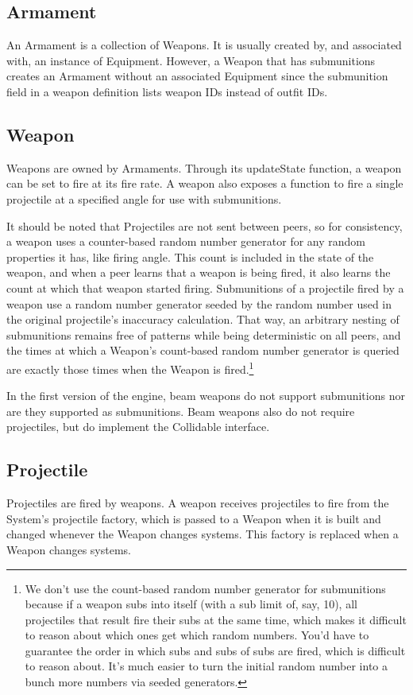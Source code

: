 \documentclass{article}
\begin{document}
\subsection{Armament}
An Armament is a collection of Weapons. It is usually created by, and associated with, an instance of Equipment. However, a Weapon that has submunitions creates an Armament without an associated Equipment since the submunition field in a weapon definition lists weapon IDs instead of outfit IDs.

\subsection{Weapon}
Weapons are owned by Armaments. Through its updateState function, a weapon can be set to fire at its fire rate. A weapon also exposes a function to fire a single projectile at a specified angle for use with submunitions.

It should be noted that Projectiles are not sent between peers, so for consistency, a weapon uses a counter-based random number generator for any random properties it has, like firing angle. This count is included in the state of the weapon, and when a peer learns that a weapon is being fired, it also learns the count at which that weapon started firing. Submunitions of a projectile fired by a weapon use a random number generator seeded by the random number used in the original projectile's inaccuracy calculation. That way, an arbitrary nesting of submunitions remains free of patterns while being deterministic on all peers, and the times at which a Weapon's count-based random number generator is queried are exactly those times when the Weapon is fired.\footnote{We don't use the count-based random number generator for submunitions because if a weapon subs into itself (with a sub limit of, say, 10), all projectiles that result fire their subs at the same time, which makes it difficult to reason about which ones get which random numbers. You'd have to guarantee the order in which subs and subs of subs are fired, which is difficult to reason about. It's much easier to turn the initial random number into a bunch more numbers via seeded generators.}

In the first version of the engine, beam weapons do not support submunitions nor are they supported as submunitions. Beam weapons also do not require projectiles, but do implement the Collidable interface.

\subsection{Projectile}
Projectiles are fired by weapons. A weapon receives projectiles to fire from the System's projectile factory, which is passed to a Weapon when it is built and changed whenever the Weapon changes systems. This factory is replaced when a Weapon changes systems.
\end{document}
